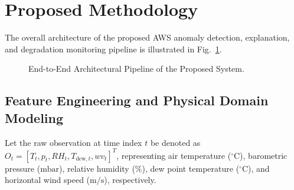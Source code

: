 \documentclass[conference]{IEEEtran}
\begin{document}
\section{Proposed Methodology}
The overall architecture of the proposed AWS anomaly detection, explanation, and degradation monitoring pipeline is illustrated in Fig.~\ref{fig:architecture}.

\begin{figure}[htbp]
\centering
{}
\caption{End-to-End Architectural Pipeline of the Proposed System.}
\label{fig:architecture}
\end{figure}

\subsection{Feature Engineering and Physical Domain Modeling}
Let the raw observation at time index $t$ be denoted as $O_t = [T_t, p_t, RH_t, T_{\text{dew},t}, wv_t]^T$, representing air temperature ($^\circ\text{C}$), barometric pressure ($\text{mbar}$), relative humidity ($\%$), dew point temperature ($^\circ\text{C}$), and horizontal wind speed ($\text{m/s}$), respectively.
\end{document}
